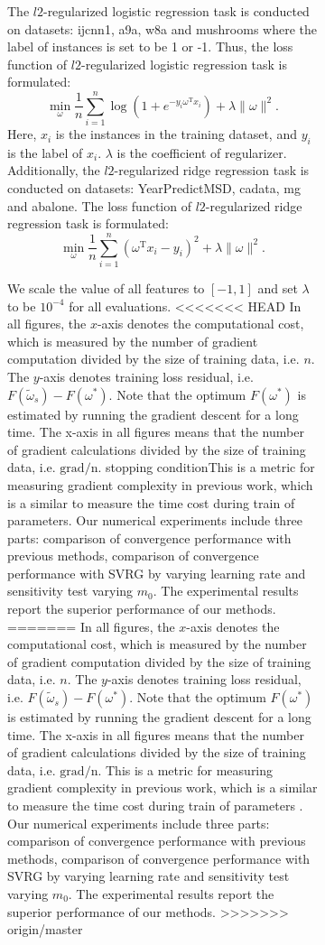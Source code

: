\documentclass[conference]{IEEEtran}
\begin{document}
\begin{algorithm}[t]
\begin{itemize}
\begin{figure}[ht]
\begin{figure}[ht]
 The $l2$-regularized logistic regression task is conducted on datasets: ijcnn1, a9a, w8a and mushrooms where the label of instances  is set to be 1 or -1. Thus, the loss function of $l2$-regularized logistic regression task is formulated:
\begin{equation}
\label{logistic_reg}
\min\limits_\omega \frac{1}{n}\sum\limits_{i=1}^n \log(1+e^{-y_i \omega^\mathrm{T} x_i }) + \lambda \parallel \omega \parallel^2.
\end{equation} Here, $x_i$ is the instances in the training dataset, and $y_i$ is the label of $x_i$. $\lambda$ is the coefficient of regularizer. Additionally, the $l2$-regularized ridge regression task is conducted on  datasets: YearPredictMSD, cadata, mg and abalone. The loss function of $l2$-regularized ridge regression task is formulated:
\begin{equation}
\label{ridge_reg}
\min\limits_\omega \frac{1}{n}\sum\limits_{i=1}^n\left(\omega^{\mathrm{T}}x_i-y_i\right)^2 + \lambda \parallel \omega \parallel^2.
\end{equation}

We scale the value of all features to $[-1,1]$ and set  $\lambda$ to be $10^{-4}$ for all evaluations. 
<<<<<<< HEAD
In all figures, the $x$-axis denotes the computational cost, which is measured by the number of gradient computation divided by the size of training data, i.e. $n$. The $y$-axis denotes training loss residual, i.e. $F(\tilde{\omega}_s) - F(\omega^{*})$. Note that the optimum $F(\omega^{*})$ is estimated by running the gradient descent for a long time. The x-axis in all figures means that the number of gradient calculations divided by the size of training data, i.e. $\mathrm{grad/n}$. stopping conditionThis is a metric for measuring gradient complexity in previous work, which is a similar to measure the time cost during train of parameters. Our numerical experiments include three parts: comparison of convergence performance with previous methods, comparison of convergence performance with SVRG by varying learning rate and sensitivity test varying $m_0$. The experimental results report the superior performance of our methods. 
=======
In all figures, the $x$-axis denotes the computational cost, which is measured by the number of gradient computation divided by the size of training data, i.e. $n$. The $y$-axis denotes training loss residual, i.e. $F(\tilde{\omega}_s) - F(\omega^{*})$. Note that the optimum $F(\omega^{*})$ is estimated by running the gradient descent for a long time. The x-axis in all figures means that the number of gradient calculations divided by the size of training data, i.e. $\mathrm{grad/n}$. This is a metric for measuring gradient complexity in previous work, which is a similar to measure the time cost during train of parameters \cite{aaa, dddd, dddd}. Our numerical experiments include three parts: comparison of convergence performance with previous methods, comparison of convergence performance with SVRG by varying learning rate and sensitivity test varying $m_0$. The experimental results report the superior performance of our methods. 
>>>>>>> origin/master




\end{figure}
\end{figure}
\end{itemize}
\end{algorithm}
\end{document}
